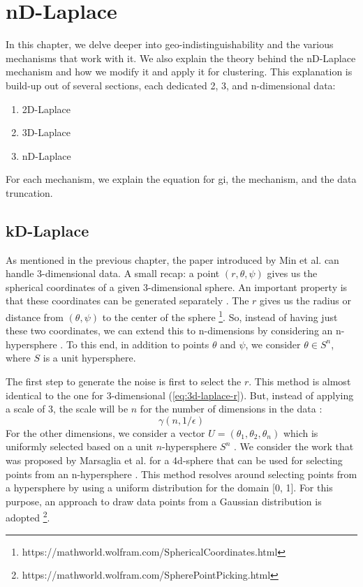 \chapter{nD-Laplace}
In this chapter, we delve deeper into geo-indistinguishability and the various mechanisms that work with it.
We also explain the theory behind the nD-Laplace mechanism and how we modify it and apply it for clustering.
This explanation is build-up out of several sections, each dedicated 2, 3, and n-dimensional data:
\begin{enumerate}
  \item 2D-Laplace
  \item 3D-Laplace
  \item nD-Laplace
\end{enumerate}
For each mechanism, we explain the equation for \gls{gi}, the mechanism, and the data truncation.



\newpage
\section{kD-Laplace}
As mentioned in the previous chapter, the paper introduced by Min et al. can handle 3-dimensional data.
A small recap: a point $(r, \theta, \psi)$ gives us the spherical coordinates of a given 3-dimensional sphere.
An important property is that these coordinates can be generated separately \citep{DBLP:journals/corr/abs-1212-1984, 9646489}.
The $r$ gives us the radius or distance from $(\theta, \psi)$ to the center of the sphere \footnote{https://mathworld.wolfram.com/SphericalCoordinates.html}.
So, instead of having just these two coordinates, we can extend this to n-dimensions by considering an n-hypersphere \citep{fernandes_generalised_2019, 9646489}.
To this end, in addition to points $\theta$ and $\psi$, we consider $\theta \in S^n$, where $S$ is a unit hypersphere.

The first step to generate the noise is first to select the $r$.
This method is almost identical to the one for 3-dimensional (\ref{eq:3d-laplace-r}).
But, instead of applying a scale of 3, the scale will be $n$ for the number of dimensions in the data \citep{fernandes_generalised_2019}:
\begin{equation}
  \gamma(n, 1/\epsilon)
  \label{eq:nd-laplace-r}
\end{equation}
For the other dimensions, we consider a vector $U = (\theta_1, \theta_2, \theta_n)$ which is uniformly selected based on a unit $n$-hypersphere $S^n$ \citep{fernandes_generalised_2019}.
We consider the work that was proposed by Marsaglia et al. for a 4d-sphere that can be used for selecting points from an n-hypersphere \citep{marsaglia_choosing_1972}.
This method resolves around selecting points from a hypersphere by using a uniform distribution for the domain [0, 1].
For this purpose, an approach to draw data points from a Gaussian distribution is adopted \footnote{https://mathworld.wolfram.com/SpherePointPicking.html}.

